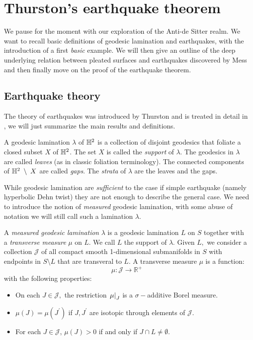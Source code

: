 \chapter{Thurston's earthquake theorem}

We pause for the moment with our exploration of the Anti-de Sitter realm. We want to recall basic definitions of geodesic lamination and earthquakes, with the introduction of a first \textit{basic} example. We will then give an outline of the deep underlying relation between pleated surfaces and earthquakes discovered by Mess and then finally move on the proof of the earthquake theorem. 


\section{Earthquake theory}
The theory of earthquakes was introduced by Thurston and is treated in detail in \cite{kapovich2001hyperbolic}, we will just summarize the main results and definitions. 

\begin{definition}
    A geodesic lamination $\lambda$ of $\mathbb{H}^2$ is a collection of disjoint geodesics that foliate a closed subset $X$ of $\mathbb{H}^2$. The set $X$ is called the \textit{support} of $\lambda.$ The geodesics in $\lambda$ are called \textit{leaves} (as in classic foliation terminology). The connected components of $\mathbb{H}^2\;\setminus\;X$ are called \textit{gaps}. The \textit{strata} of $\lambda$ are the leaves and the gaps.
\end{definition}

While geodesic lamination are \textit{sufficient} to the case if simple earthquake (namely hyperbolic Dehn twist) they are not enough to describe the general case. We need to introduce the notion of \textit{measured} geodesic lamination, with some abuse of notation we will still call such a lamination $\lambda$.

\begin{definition}
    A \textit{measured geodesic lamination} $\lambda$ is a geodesic lamination $L$ on $S$ together with a \textit{transverse measure} $\mu$ on $L$. We call $L$ the support of $\lambda$. Given $L,$ we consider a collection $\mathcal{J}$ of all compact smooth 1-dimensional submanifolds in $S$ with endpoints in $S\setminus L$ that are transveral to $L$. A transverse measure $\mu$ is a function: 
    \begin{equation}
        \mu: \mathcal{J} \rightarrow \mathbb{R}^+
    \end{equation}
    with the following properties: 
    \begin{itemize}
        \item On each $J\in\mathcal{J},$ the restriction $\left.\mu\right|_{J}$ is a $\sigma-$additive Borel measure. 
        \item $\mu(J)=\mu(J^{\prime})$ if $J,J^{\prime} $ are isotopic through elements of $\mathcal{J}$. 
        \item For each $J\in\mathcal{J}$, $\mu(J)>0$ if and only if $J\cap L\neq \emptyset$.   
    \end{itemize}
\end{definition}


